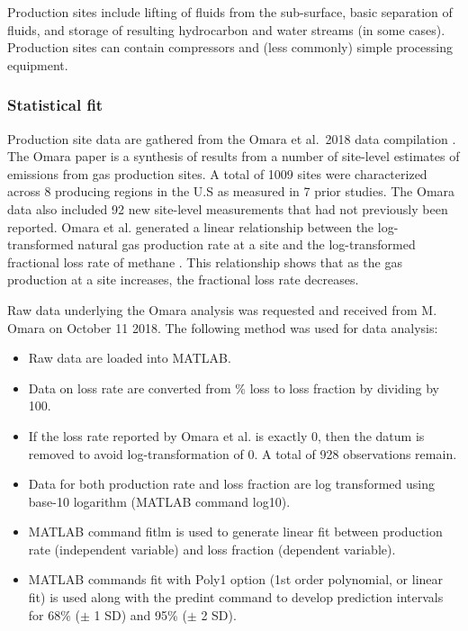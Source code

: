 \documentclass[11pt]{report}
\newcommand{\prm}[1]{\textsf{#1}}
\begin{document}
Production sites include lifting of fluids from the sub-surface, basic separation of fluids, and storage of resulting hydrocarbon and water streams (in some cases). Production sites can contain compressors and (less commonly) simple processing equipment.

\subsubsection{Statistical fit}

Production site data are gathered from the Omara et al.\ 2018 data compilation \cite{Omara2018}. The Omara paper is a synthesis of results from a number of site-level estimates of emissions from gas production sites. A total of 1009 sites were characterized across 8 producing regions in the U.S as measured in 7 prior studies. The Omara data also included 92 new site-level measurements that had not previously been reported. Omara et al. generated a linear relationship between the log-transformed natural gas production rate at a site and the log-transformed fractional loss rate of methane \cite[Figure 3]{Omara2018}. This relationship shows that as the gas production at a site increases, the fractional loss rate decreases.

Raw data underlying the Omara analysis was requested and received from M. Omara on October 11 2018. The following method was used for data analysis:
\begin{itemize}
\item Raw data are loaded into MATLAB.
\item Data on loss rate are converted from \% loss to loss fraction by dividing by 100.
\item If the loss rate reported by Omara et al. is exactly 0, then the datum is removed to avoid log-transformation of 0. A total of 928 observations remain. 
\item Data for both production rate and loss fraction are log transformed using base-10 logarithm (MATLAB command \prm{log10}).
\item MATLAB command \prm{fitlm} is used to generate linear fit between production rate (independent variable) and loss fraction (dependent variable). 
\item MATLAB commands \prm{fit} with \prm{Poly1} option (1st order polynomial, or linear fit) is used along with the \prm{predint} command to develop prediction intervals for 68\% ($\pm$ 1 SD) and 95\% ($\pm$ 2 SD).
\end{itemize} 
\end{document}
